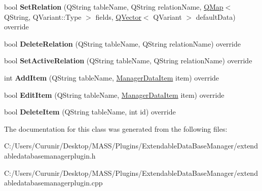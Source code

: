 \begin{DoxyCompactItemize}
\item 
\mbox{\label{class_extendable_data_base_manager_plugin_a572eff2f383b0be3e99178e6dcee78e9}} 
bool {\bfseries Set\+Relation} (Q\+String table\+Name, Q\+String relation\+Name, \hyperlink{class_q_map}{Q\+Map}$<$ Q\+String, Q\+Variant\+::\+Type $>$ fields, \hyperlink{class_q_vector}{Q\+Vector}$<$ Q\+Variant $>$ default\+Data) override
\item 
\mbox{\label{class_extendable_data_base_manager_plugin_a75fccf6c256cf6500ac1d7421c131bc2}} 
bool {\bfseries Delete\+Relation} (Q\+String table\+Name, Q\+String relation\+Name) override
\item 
\mbox{\label{class_extendable_data_base_manager_plugin_a2a8f2e7f2fbeef891da297dadd0cd548}} 
bool {\bfseries Set\+Active\+Relation} (Q\+String table\+Name, Q\+String relation\+Name) override
\item 
\mbox{\label{class_extendable_data_base_manager_plugin_a1fe950472f4798d7278dca6b24055c9c}} 
int {\bfseries Add\+Item} (Q\+String table\+Name, \hyperlink{class_i_extendable_data_base_manager_plugin_1_1_manager_data_item}{Manager\+Data\+Item} item) override
\item 
\mbox{\label{class_extendable_data_base_manager_plugin_a09ee5b2121ac6f5e3311701a59584fc6}} 
bool {\bfseries Edit\+Item} (Q\+String table\+Name, \hyperlink{class_i_extendable_data_base_manager_plugin_1_1_manager_data_item}{Manager\+Data\+Item} item) override
\item 
\mbox{\label{class_extendable_data_base_manager_plugin_a91081c54f128faf88cc4f25aaf9980f4}} 
bool {\bfseries Delete\+Item} (Q\+String table\+Name, int id) override
\end{DoxyCompactItemize}


The documentation for this class was generated from the following files\+:\begin{DoxyCompactItemize}
\item 
C\+:/\+Users/\+Curunir/\+Desktop/\+M\+A\+S\+S/\+Plugins/\+Extendable\+Data\+Base\+Manager/extendabledatabasemanagerplugin.\+h\item 
C\+:/\+Users/\+Curunir/\+Desktop/\+M\+A\+S\+S/\+Plugins/\+Extendable\+Data\+Base\+Manager/extendabledatabasemanagerplugin.\+cpp\end{DoxyCompactItemize}
